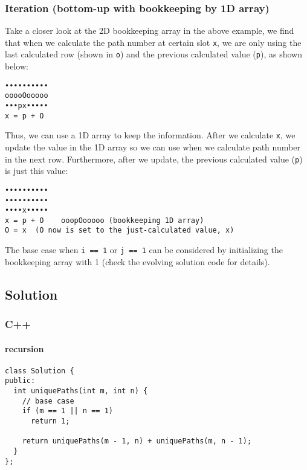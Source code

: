 \documentclass[11pt]{article}
\begin{document}
\subsubsection{Iteration (bottom-up with bookkeeping by 1D array)}
\label{sec:org6d91a97}
Take a closer look at the 2D bookkeeping array in the above example, we find that when we calculate the path number at certain slot \texttt{x}, we are only using the last calculated row (shown in \texttt{o}) and the previous calculated value (\texttt{p}), as shown below:
\begin{Verbatim}[frame=single]
••••••••••
ooooOooooo
•••px•••••
x = p + O
\end{Verbatim}
Thus, we can use a 1D array to keep the information. After we calculate \texttt{x}, we update the value in the 1D array so we can use when we calculate path number in the next row. Furthermore, after we update, the previous calculated value (\texttt{p}) is just this value:
\begin{Verbatim}[frame=single]
••••••••••
••••••••••   
••••x•••••
x = p + O    ooopOooooo (bookkeeping 1D array)
O = x  (O now is set to the just-calculated value, x)
\end{Verbatim}

The base case when \texttt{i == 1} or \texttt{j == 1} can be considered by initializing the bookkeeping array with 1 (check the evolving solution code for details).

\subsection{Solution}
\label{sec:org54c4eaa}
\subsubsection{C++}
\label{sec:org395a902}
\paragraph{recursion}
\label{sec:org53428b7}
\begin{verbatim}
class Solution {
public:
  int uniquePaths(int m, int n) {
    // base case 
    if (m == 1 || n == 1)
      return 1;

    return uniquePaths(m - 1, n) + uniquePaths(m, n - 1);
  }
};
\end{verbatim}
\end{document}
